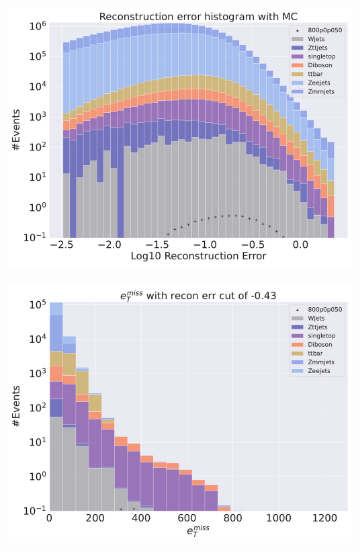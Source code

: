 \begin{figure}[H]
    \centering
    \begin{subfigure}{.40\textwidth}
        \includegraphics[width=\textwidth]{Figures/VAE_testing/small/2lep/b_data_recon_big_rm3_feats_sig_800p0p050_.pdf}
        \caption{ }
        \label{fig:VAE_2lep_small_800_3}
    \end{subfigure}
    \hfill
    \begin{subfigure}{.40\textwidth}
        \includegraphics[width=\textwidth]{Figures/VAE_testing/small/2lep/b_data_recon_big_rm3_feats_sig_800p0p050_recon_errcut_-0.43.pdf}
        \caption{}
        \label{fig:VAE_2lep_small_etmiss_800_3}
    \end{subfigure}

\end{figure}
